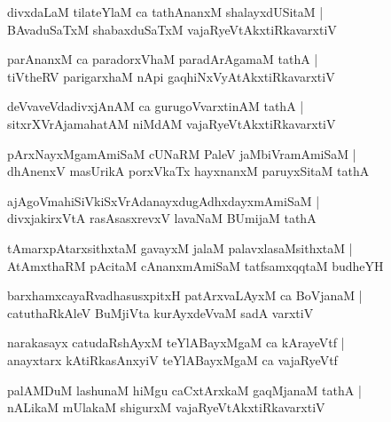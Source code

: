 \documentclass[twoside,12pt,openright]{book}
\newcounter{shloka}[chapter]
\begin{document}
\begin{shloka}%
divxdaLaM tilateYlaM ca tathAnanxM shalayxdUSitaM |\\
BAvaduSaTxM shabaxduSaTxM vajaRyeVtAkxtiRkavarxtiV 
\end{shloka}

\begin{shloka}%
parAnanxM ca paradorxVhaM paradArAgamaM tathA |\\
tiVtheRV parigarxhaM nApi gaqhiNxVyAtAkxtiRkavarxtiV 
\end{shloka}

\begin{shloka}%
deVvaveVdadivxjAnAM ca gurugoVvarxtinAM tathA |\\
sitxrXVrAjamahatAM niMdAM vajaRyeVtAkxtiRkavarxtiV 
\end{shloka}

\begin{shloka}%
pArxNayxMgamAmiSaM cUNaRM PaleV jaMbiVramAmiSaM |\\
dhAnenxV masUrikA porxVkaTx hayxnanxM paruyxSitaM tathA 
\end{shloka}

\begin{shloka}%
ajAgoVmahiSiVkiSxVrAdanayxdugAdhxdayxmAmiSaM |\\
divxjakirxVtA rasAsasxrevxV lavaNaM BUmijaM tathA 
\end{shloka}

\begin{shloka}%
tAmarxpAtarxsithxtaM gavayxM jalaM palavxlasaMsithxtaM |\\
AtAmxthaRM pAcitaM cAnanxmAmiSaM tatfsamxqqtaM budheYH
\end{shloka}

\begin{shloka}%
barxhamxcayaRvadhasusxpitxH patArxvaLAyxM ca BoVjanaM |\\
catuthaRkAleV BuMjiVta kurAyxdeVvaM sadA varxtiV
\end{shloka}

\begin{shloka}%
narakasayx catudaRshAyxM teYlABayxMgaM ca kArayeVtf |\\
anayxtarx kAtiRkasAnxyiV teYlABayxMgaM ca vajaRyeVtf
\end{shloka}

\begin{shloka}%
palAMDuM lashunaM hiMgu caCxtArxkaM gaqMjanaM tathA |\\
nALikaM mUlakaM shigurxM vajaRyeVtAkxtiRkavarxtiV 
\end{shloka}
\end{document}
